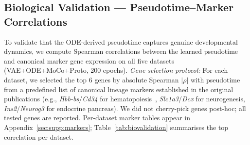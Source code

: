 \documentclass[journal]{IEEEtran}
\begin{document}

\subsection{Biological Validation --- Pseudotime--Marker Correlations}
\label{sec:results:bio}

To validate that the ODE-derived pseudotime captures genuine developmental dynamics, we compute Spearman correlations between the learned pseudotime and canonical marker gene expression on all five datasets (VAE+ODE+MoCo+Proto, 200 epochs). \textit{Gene selection protocol:} For each dataset, we selected the top 6 genes by absolute Spearman $|\rho|$ with pseudotime from a predefined list of canonical lineage markers established in the original publications (e.g., \textit{Hbb-bs}/\textit{Cd34} for hematopoiesis~\cite{paul2015transcriptional}, \textit{Slc1a3}/\textit{Dcx} for neurogenesis, \textit{Ins2}/\textit{Neurog3} for endocrine pancreas). We did not cherry-pick genes post-hoc; all tested genes are reported. Per-dataset marker tables appear in Appendix~\ref{sec:supp:markers}; Table~\ref{tab:biovalidation} summarises the top correlation per dataset.

\begin{table}[!t]
    \centering
    \caption{Biovalidation summary across all five datasets (VAE+ODE+MoCo+Proto, 200 epochs).}
    \label{tab:biovalidation}
\end{table}
\end{document}

